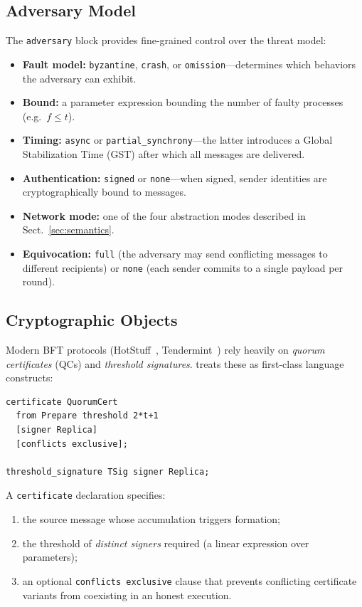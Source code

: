 \subsection{Adversary Model}

The \texttt{adversary} block provides fine-grained control over the
threat model:
\begin{itemize}
  \item \textbf{Fault model:} \texttt{byzantine}, \texttt{crash}, or
    \texttt{omission}---determines which behaviors the adversary can
    exhibit.
  \item \textbf{Bound:} a parameter expression bounding the number of
    faulty processes (e.g.\ $f \leq t$).
  \item \textbf{Timing:} \texttt{async} or
    \texttt{partial\_synchrony}---the latter introduces a Global
    Stabilization Time (GST) after which all messages are delivered.
  \item \textbf{Authentication:} \texttt{signed} or \texttt{none}---when
    signed, sender identities are cryptographically bound to messages.
  \item \textbf{Network mode:} one of the four abstraction modes
    described in Sect.~\ref{sec:semantics}.
  \item \textbf{Equivocation:} \texttt{full} (the adversary may send
    conflicting messages to different recipients) or \texttt{none}
    (each sender commits to a single payload per round).
\end{itemize}

\subsection{Cryptographic Objects}\label{sec:crypto}

Modern BFT protocols (HotStuff~\cite{YinMGRGA2019},
Tendermint~\cite{BuchmanKM2018}) rely heavily on \emph{quorum
certificates} (QCs) and \emph{threshold signatures}.  \tarsier{} treats
these as first-class language constructs:

\begin{lstlisting}
certificate QuorumCert
  from Prepare threshold 2*t+1
  [signer Replica]
  [conflicts exclusive];

threshold_signature TSig signer Replica;
\end{lstlisting}

A \texttt{certificate} declaration specifies:
\begin{enumerate}
  \item the source message whose accumulation triggers formation;
  \item the threshold of \emph{distinct signers} required (a linear
    expression over parameters);
  \item an optional \texttt{conflicts exclusive} clause that prevents
    conflicting certificate variants from coexisting in an honest
    execution.
\end{enumerate}


